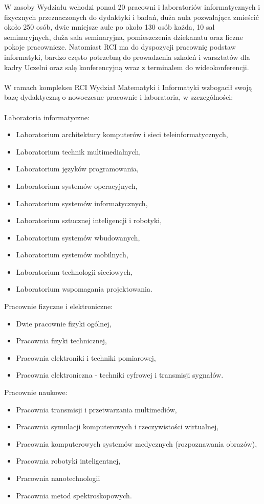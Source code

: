 \documentclass[a4paper,12pt]{article}
\begin{document}
W zasoby Wydziału wchodzi ponad 20 pracowni i laboratoriów informatycznych i fizycznych przeznaczonych
do dydaktyki i badań, duża aula pozwalająca zmieścić około 250 osób, dwie mniejsze aule po około 130 osób
każda, 10 sal seminaryjnych, duża sala seminaryjna, pomieszczenia dziekanatu oraz liczne pokoje pracownicze.
Natomiast RCI ma do dyspozycji pracownię podstaw informatyki, bardzo często potrzebną do prowadzenia
szkoleń i warsztatów dla kadry Uczelni oraz salę konferencyjną wraz z terminalem do wideokonferencji.\\\\
W ramach kompleksu RCI Wydział Matematyki i Informatyki wzbogacił swoją bazę dydaktyczną o
nowoczesne pracownie i laboratoria, w szczególności:\\\\
Laboratoria informatyczne:
\begin{itemize}
\item Laboratorium architektury komputerów i sieci teleinformatycznych,
\item Laboratorium technik multimedialnych,
\item Laboratorium języków programowania,

\item Laboratorium systemów operacyjnych,

\item Laboratorium systemów informatycznych,

\item Laboratorium sztucznej inteligencji i robotyki,
\item Laboratorium systemów wbudowanych,
\item Laboratorium systemów mobilnych,

\item Laboratorium technologii sieciowych,
\item Laboratorium wspomagania projektowania.
\end{itemize}

Pracownie fizyczne i elektroniczne:
\begin{itemize}
\item Dwie pracownie fizyki ogólnej,
\item Pracownia fizyki technicznej,
\item Pracownia elektroniki i techniki pomiarowej,
\item {Pracownia elektroniczna - techniki cyfrowej i transmisji sygnałów.}
\end{itemize}
Pracownie naukowe:
\begin{itemize}
\item Pracownia transmisji i przetwarzania multimediów,
\item Pracownia symulacji komputerowych i rzeczywistości wirtualnej,
\item Pracownia komputerowych systemów medycznych (rozpoznawania obrazów),
\item Pracownia robotyki inteligentnej,
\item Pracownia nanotechnologii
\item Pracownia metod spektroskopowych.

\end{itemize}
\end{document}
